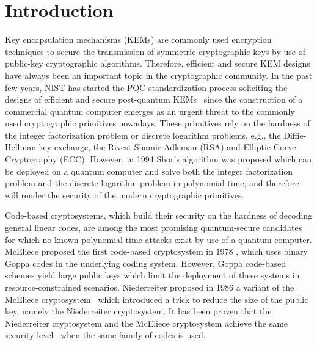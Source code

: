 \documentclass[runningheads]{llncs}
\begin{document}
\section{Introduction}
Key encapsulation mechanisms (KEMs) are commonly used encryption techniques
to secure the transmission of symmetric cryptographic keys
by use of public-key cryptographic algorithms.
Therefore, efficient and secure KEM designs have always been an important topic
in the cryptographic community.
In the past few years, NIST has started the PQC standardization process
soliciting the designs of efficient and secure post-quantum KEMs~\cite{chen2016report}
since the construction of a commercial quantum computer emerges as an urgent
threat to the commonly used cryptographic primitives nowadays.
These primitives rely on the hardness of the integer factorization problem or
discrete logarithm problems, e.g., the Diffie-Hellman key exchange,
the Rivest-Shamir-Adleman (RSA) and Elliptic Curve Cryptography (ECC).
However, in 1994 Shor's algorithm \cite{shor1997polynomial} was proposed
which can be deployed
on a quantum computer and solve both the integer factorization problem
and the discrete logarithm problem in polynomial time, and therefore will
render the security of the modern cryptographic primitives.

Code-based cryptosystems, which build their security on the hardness of
decoding general linear codes, are among the most promising quantum-secure
candidates for which no known polynomial time attacks exist by use of a quantum computer.
McEliece proposed the first code-based cryptosystem in 1978 \cite{mceliece1978public},
which uses binary Goppa codes \cite{goppa1970new} in the underlying coding system.
However, Goppa code-based schemes yield large public keys which limit
the deployment of these systems in resource-constrained scenarios.
Niederreiter proposed in 1986 a variant of the McEliece cryptosystem~\cite{niederreiter1986knapsack}
which introduced a trick to reduce the size of the public key,
namely the Niederreiter cryptosystem.
It has been proven that the Niederreiter cryptosystem and the McEliece cryptosystem
achieve the same security level~\cite{li1994equivalence} when the same family of codes is used.
\end{document}
